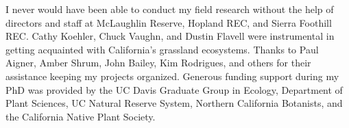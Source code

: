 \documentclass[twoside,12pt,final]{ucthesis-CA2012}
\begin{document}
\begin{ucfrontmatter}
\begin{acknowledgements}
    I never would have been able to conduct my field research without the help of directors and staff at McLaughlin Reserve, Hopland REC, and Sierra Foothill REC. Cathy Koehler, Chuck Vaughn, and Dustin Flavell were instrumental in getting acquainted with California's grassland ecosystems. Thanks to Paul Aigner, Amber Shrum, John Bailey, Kim Rodrigues, and others for their assistance keeping my projects organized.
    Generous funding support during my PhD was provided by the UC Davis Graduate Group in Ecology, Department of Plant Sciences, UC Natural Reserve System, Northern California Botanists, and the California Native Plant Society.
  \end{acknowledgements}
% 
% 
% 
% 
% 
% 


\end{ucfrontmatter}
\end{document}
